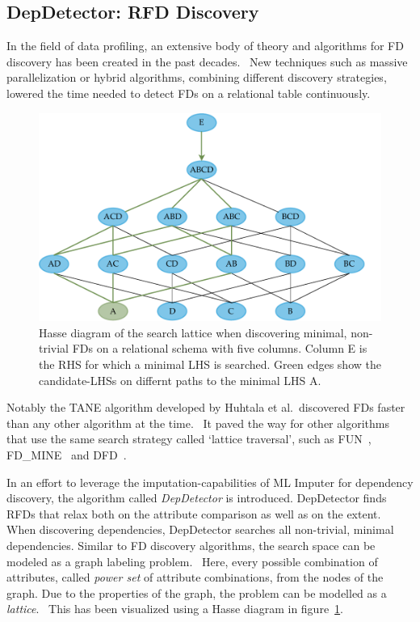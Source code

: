 \subsection{DepDetector: RFD Discovery}
In the field of data profiling, an extensive body of theory and algorithms for FD discovery has been created in the past decades.~\cite[p.~39]{ABE19}
New techniques such as massive parallelization or hybrid algorithms, combining different discovery strategies, lowered the time needed to detect FDs on a relational table continuously.~\cite[p.~40]{ABE19}

\begin{figure}[ht]
     \centering
     \includegraphics[width=\textwidth]{images/search-lattice-fd.pdf}
     \caption{Hasse diagram of the search lattice when discovering minimal, non-trivial FDs on a relational schema with five columns. Column \textsc{E} is the RHS for which a minimal LHS is searched. Green edges show the candidate-LHSs on differnt paths to the minimal LHS \textsc{A}.}
     \label{fig:dep-detector-search-tree}
 \end{figure}

Notably the \textsc{TANE} algorithm developed by Huhtala et al.\ discovered FDs faster than any other algorithm at the time.~\cite{HUH99}
It paved the way for other algorithms that use the same search strategy called `lattice traversal', such as \textsc{FUN}~\cite{NOV08}, \textsc{FD\_MINE}~\cite{YAO02} and \textsc{DFD}~\cite{ABE14}.~\cite[p.~39]{ABE19}

In an effort to leverage the imputation-capabilities of ML Imputer for dependency discovery, the algorithm called \emph{DepDetector} is introduced.
DepDetector finds RFDs that relax both on the attribute comparison as well as on the extent.
When discovering dependencies, DepDetector searches all non-trivial, minimal dependencies.
Similar to FD discovery algorithms, the search space can be modeled as a graph labeling problem.~\cite[p.~24]{ABE19}
Here, every possible combination of attributes, called \emph{power set} of attribute combinations, from the nodes of the graph.
Due to the properties of the graph, the problem can be modelled as a \emph{lattice}.~\cite[p.~24]{ABE19}
This has been visualized using a Hasse diagram in figure~\ref{fig:dep-detector-search-tree}.

